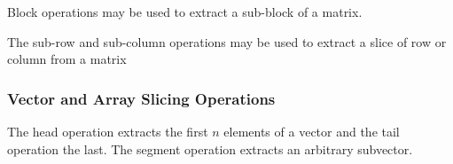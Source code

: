 \begin{description}
{\begin{description}
Block operations may be used to extract a sub-block of a matrix.


\begin{description}  \end{description}


The sub-row and sub-column operations may be used to extract a slice of row or column from a matrix


\begin{description}   \end{description}


\subsubsection{Vector and Array Slicing Operations}


The head operation extracts the first $n$ elements of a vector and the tail operation the last.  The segment operation extracts an arbitrary subvector.



\end{description}}
\end{description}
